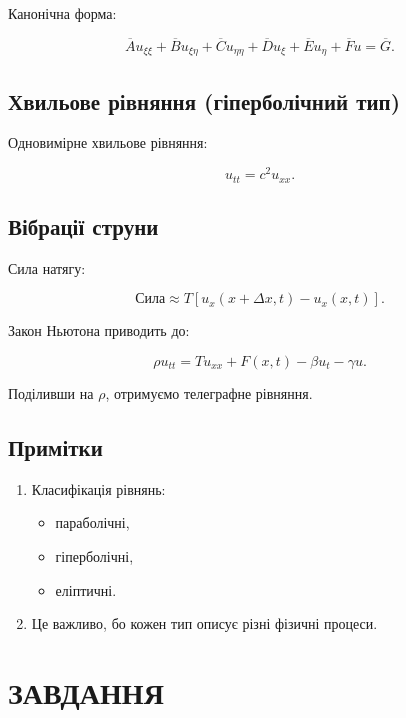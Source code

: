 \documentclass[
  ukrainian,
]{article}
\providecommand{\tightlist}{%
  \setlength{\itemsep}{0pt}\setlength{\parskip}{0pt}}
\begin{document}
Канонічна форма:

\[
\overline{A}u_{\xi\xi} + \overline{B}u_{\xi\eta} + \overline{C}u_{\eta\eta} + \overline{D}u_{\xi} + \overline{E}u_{\eta} + \overline{F}u = \overline{G}.
\]

\subsection{Хвильове рівняння (гіперболічний
тип)}\label{ux445ux432ux438ux43bux44cux43eux432ux435-ux440ux456ux432ux43dux44fux43dux43dux44f-ux433ux456ux43fux435ux440ux431ux43eux43bux456ux447ux43dux438ux439-ux442ux438ux43f}

Одновимірне хвильове рівняння:

\[
u_{tt} = c^2 u_{xx}.
\]

\subsection{Вібрації
струни}\label{ux432ux456ux431ux440ux430ux446ux456ux457-ux441ux442ux440ux443ux43dux438}

Сила натягу:

\[
\text{Сила} \approx T \left[ u_x(x + \Delta x, t) - u_x(x, t) \right].
\]

Закон Ньютона приводить до:

\[
\rho u_{tt} = T u_{xx} + F(x,t) - \beta u_t - \gamma u.
\]

Поділивши на \(\rho\), отримуємо телеграфне рівняння.

\subsection{Примітки}\label{ux43fux440ux438ux43cux456ux442ux43aux438-2}

\begin{enumerate}
\def\labelenumi{\arabic{enumi}.}
\tightlist
\item
  Класифікація рівнянь:

  \begin{itemize}
  \tightlist
  \item
    параболічні,
  \item
    гіперболічні,
  \item
    еліптичні.
  \end{itemize}
\item
  Це важливо, бо кожен тип описує різні фізичні процеси.
\end{enumerate}

\section{ЗАВДАННЯ}\label{ux437ux430ux432ux434ux430ux43dux43dux44f-10}
\end{document}
